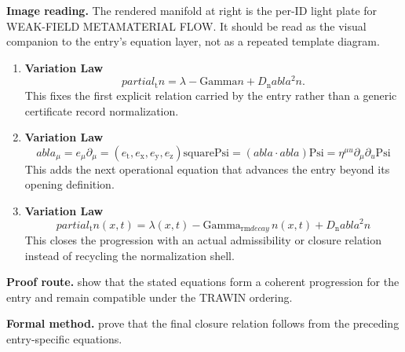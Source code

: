\begin{samepage}
\noindent\begin{minipage}[t]{0.45\linewidth}
\vspace{0pt}
\raggedright
\scriptsize\textbf{Image reading.} The rendered manifold at right is the per-ID light plate for WEAK-FIELD METAMATERIAL FLOW. It should be read as the visual companion to the entry's equation layer, not as a repeated template diagram.\par
\end{minipage}\hfill
\begin{minipage}[t]{0.53\linewidth}
\vspace*{-0.10in}
\raggedright
{}
\end{minipage}
\end{samepage}

\clearpage


\begin{enumerate}[leftmargin=1.6em,itemsep=9pt,topsep=6pt]
\item \textbf{Variation Law}
\[
partial_{\mathrm{t}} n = \lambda - \mathrm{Gamma} n + D_{\mathrm{n}}  abla^2 n.
\]
This fixes the first explicit relation carried by the entry rather than a generic certificate record normalization.

\item \textbf{Variation Law}
\[
abla_\mu = e_\mu \partial_\mu = (e_{\mathrm{t}}, e_{\mathrm{x}}, e_{\mathrm{y}}, e_{\mathrm{z}}) \mathrm{square} \mathrm{Psi} = ( abla \cdot  abla)\mathrm{Psi} = \eta^{\mu u}\partial_\mu \partial_ u \mathrm{Psi}
\]
This adds the next operational equation that advances the entry beyond its opening definition.

\item \textbf{Variation Law}
\[
partial_{\mathrm{t}} n(x,t) = \lambda(x,t) - \mathrm{Gamma}_{\mathrm{rm} decay}\, n(x,t) + D_{\mathrm{n}} abla^2 n
\]
This closes the progression with an actual admissibility or closure relation instead of recycling the normalization shell.
\end{enumerate}

\textbf{Proof route.} show that the stated equations form a coherent progression for the entry and remain compatible under the TRAWIN ordering.

\textbf{Formal method.} prove that the final closure relation follows from the preceding entry-specific equations.

